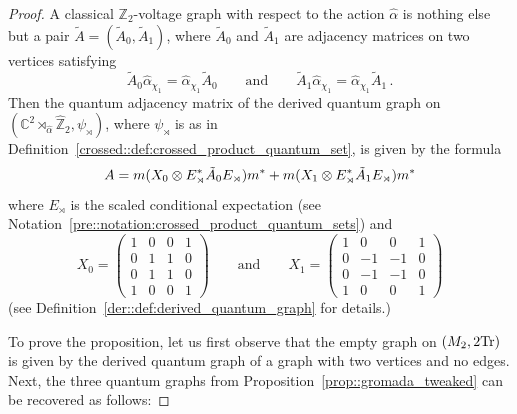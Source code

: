 \documentclass{amsart}
\theoremstyle{definition}
\theoremstyle{definition}
\begin{document}
\begin{proof}
A classical $\mathbb{Z}_2$-voltage graph with respect to the action $\hat{\alpha}$ is nothing else but a pair $\tilde{A}=(\tilde{A}_0,\tilde{A}_1)$, where $\tilde{A}_0$ and $\tilde{A}_1$ are adjacency matrices on two vertices satisfying
\begin{equation}\label{ex::adjmat1}
\tilde{A}_0\hat{\alpha}_{\chi_1}=\hat{\alpha}_{\chi_1}\tilde{A}_0\qquad\text{and}\qquad \tilde{A}_1\hat{\alpha}_{\chi_1}=\hat{\alpha}_{\chi_1}\tilde{A}_1\,.
\end{equation}
Then the quantum adjacency matrix of the derived quantum graph on $(\mathbb{C}^2\rtimes_{\hat{\alpha}}\hat{\mathbb{Z}}_2,\psi_\rtimes)$, where $\psi_\rtimes$ is as in Definition~\ref{crossed::def:crossed_product_quantum_set}, is given by the formula
\[
A=m(X_0\otimes E^*_\rtimes \tilde{A}_0E_\rtimes)m^*+m(X_1\otimes E^*_\rtimes \tilde{A}_1E_\rtimes)m^*\\
\]
where $E_\rtimes$ is the scaled conditional expectation (see Notation~\ref{pre::notation:crossed_product_quantum_sets}) and
\[
X_0=\begin{pmatrix}1 & 0 & 0 & 1\\ 0 & 1 & 1 & 0 \\ 0 & 1 & 1 & 0\\ 1 & 0 & 0 & 1\end{pmatrix}\qquad\text{and}\qquad X_1=\begin{pmatrix}1 & 0 & 0 & 1\\ 0 & -1 & -1 & 0 \\ 0 & -1 & -1 & 0\\ 1 & 0 & 0 & 1\end{pmatrix}
\]
(see Definition~\ref{der::def:derived_quantum_graph} for details.)

To prove the proposition, let us first observe that the empty graph on $(M_2,2{\rm Tr})$ is given by the derived quantum graph of a graph with two vertices and no edges. Next, the three quantum graphs from Proposition~\ref{prop::gromada_tweaked} can be recovered as follows:


\end{proof}
\end{document}
